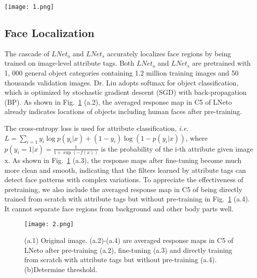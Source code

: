 \documentclass[10pt,twocolumn,letterpaper]{article}
\begin{document}
\begin{figure*}
	\begin{center}
		\texttt{[image: 1.png]}
	\end{center}
	\caption{The proposed pipeline of attribute prediction (\bfseries Best viewed in color)}
	\label{fig:1}
\end{figure*}

\subsection{Face Localization}

The cascade of $LNet_o$ and $LNet_s$ accurately localizes face regions by being trained on image-level attribute tags. Both $LNet_o$ and $LNet_s$ are pretrained with 1, 000 general object categories containing 1.2 million training images and 50 thousands validation images. Dr. Liu adopts softmax for object classification, which is optimized by stochastic gradient descent (SGD) with back-propagation (BP). As shown in Fig.~\ref{Localization} (a.2), the averaged response map in C5 of LNeto already indicates locations of objects including human faces after pre-training.

The cross-entropy loss is used for attribute classification, \emph{i.e.} $L =\sum_{i=1} y_i \log p(y_i|x)+(1-y_i)\log(1-p(y_i|x))$, where $p(y_i = 1|x) = \frac{1}{1+\exp(-f(x))}$ is the probability of the i-th attribute given image x. As shown in Fig.~\ref{Localization} (a.3), the response maps after fine-tuning become much more clean and smooth, indicating that the filters learned by attribute tags can detect face patterns with complex variations. To appreciate the effectiveness of pretraining, we also include the averaged response map in C5 of being directly trained from scratch with attribute tags but without pre-training in Fig.~\ref{Localization} (a.4). It cannot separate face regions from background and other body parts well.

\begin{figure}[h]
	\begin{center}
		\texttt{[image: 2.png]}
	\end{center}
	\caption{(a.1) Original image. (a.2)-(a.4) are averaged response maps in C5 of LNeto after pre-training (a.2), fine-tuning (a.3) and directly training from scratch with attribute tags but without pre-training (a.4). (b)Determine threshold.}
	\label{Localization}
\end{figure}
\end{document}
